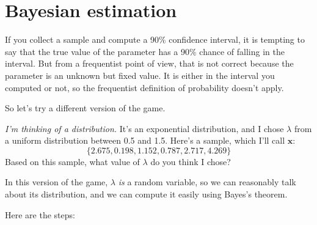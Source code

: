 \documentclass[12pt]{book}
\begin{document}








\section{Bayesian estimation}

If you collect a sample and compute a 90\% confidence interval, it is
tempting to say that the true value of the parameter has a 90\% chance
of falling in the interval.  But from a frequentist point of view,
that is not correct because the parameter is an unknown but fixed
value.  It is either in the interval you computed or not, so the
frequentist definition of probability doesn't apply.


So let's try a different version of the game.

\newcommand{\boldx}{\mathbf{x}}


{\em I'm thinking of a distribution.}  It's an exponential
distribution, and I chose $\lambda$ from a uniform distribution
between 0.5 and 1.5.  Here's a sample, which I'll call $\boldx$:
%
\[ \{ 2.675, 0.198, 1.152, 0.787, 2.717, 4.269 \} \]
%
Based on this sample, what value of $\lambda$ do you think I chose?

In this version of the game, $\lambda$ {\em is} a random variable, so we
can reasonably talk about its distribution, and we can compute it
easily using Bayes's theorem.

Here are the steps:
\end{document}
